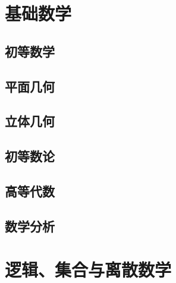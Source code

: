 \documentclass[zihao=false,linespread=1.5,heading=true,a4paper,oneside,fontset=windows]{ctexbook}
\begin{document}
\thispagestyle{empty}%
\hypersetup{pageanchor=false}


\setcounter{page}{1}%
\hypersetup{pageanchor=true}

\newpage


\newpage

\tableofcontents
\newpage

\part{基础数学}\label{part:basic-mathematics}

\chapter{初等数学}\label{chap:elementary-mathematics}


\chapter{平面几何}\label{chap:plane-geometry}


\chapter{立体几何}\label{chap:solid-geometry}


\chapter{初等数论}\label{chap:elementary-number-theory}


\chapter{高等代数}\label{chap:linear-algebra}


\chapter{数学分析}\label{chap:mathematical-analysis}


\part{逻辑、集合与离散数学}\label{part:logic-discrete}
\end{document}
